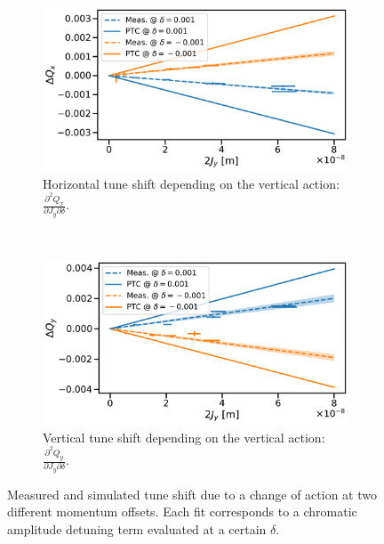 \begin{figure}[H]
    \begin{subfigure}{0.9\textwidth}
        \centering
        \includegraphics[width=\textwidth]{images/chromatic_amplitude_detuning/B2_Qxy.pdf}
        \caption{Horizontal tune shift depending on the vertical action: 
        $\frac{\partial^2 Q_x}{\partial J_y \partial \delta}$.}
        \label{figure:decapoles:chromatic_amplitude_detuning:b2qxy}
    \end{subfigure}
    \\[2em]
    \begin{subfigure}{0.9\textwidth}
        \centering
        \includegraphics[width=\textwidth]{images/chromatic_amplitude_detuning/B2_Qyy.pdf}
        \caption{Vertical tune shift depending on the vertical action: 
        $\frac{\partial^2 Q_y}{\partial J_y \partial \delta}$.}
        \label{figure:decapoles:chromatic_amplitude_detuning:b2qyy}
    \end{subfigure}
    \caption{Measured and simulated tune shift due to a change of action at two different
    momentum offsets. Each fit corresponds to a chromatic amplitude detuning term evaluated at a
    certain $\delta$.}
    \label{figure:decapoles:chromatic_amplitude_detuning:two_terms}
\end{figure}


